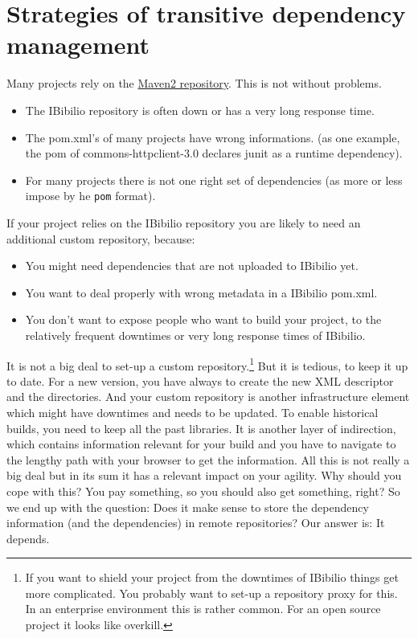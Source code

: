 \section{Strategies of transitive dependency management} %
\label{sec:strategies_of_transitive_dependency_management}
Many projects rely on the \href{http://repo1.maven.org/maven2}{Maven2 repository}. This is not without problems.
\begin{itemize}
	\item The IBibilio repository is often down or has a very long response time.
	\item The pom.xml's of many projects have wrong informations. (as one example, the pom of commons-httpclient-3.0 declares junit as a runtime dependency).
	\item For many projects there is not one right set of dependencies (as more or less impose by he \texttt{pom} format).
\end{itemize}
If your project relies on the IBibilio repository you are likely to need an additional custom repository, because:
\begin{itemize}
	\item You might need dependencies that are not uploaded to IBibilio yet.
	\item You want to deal properly with wrong metadata in a IBibilio pom.xml.
	\item You don't want to expose people who want to build your project, to the relatively frequent downtimes or very long response times of IBibilio.
\end{itemize}
It is not a big deal to set-up a custom repository.\footnote{If you want to shield your project from the downtimes of IBibilio things get more complicated. You probably want to set-up a repository proxy for this. In an enterprise environment this is rather common. For an open source project it looks like overkill.} But it is tedious, to keep it up to date. For a new version, you have always to create the new XML descriptor and the directories. And your custom repository is another infrastructure element which might have downtimes and needs to be updated. To enable historical builds, you need to keep all the past libraries. It is another layer of indirection, which contains information relevant for your build and you have to navigate to the lengthy path with your browser to get the information. All this is not really a big deal but in its sum it has a relevant impact on your agility. Why should you cope with this? You pay something, so you should also get something, right? So we end up with the question: Does it make sense to store the dependency information (and the dependencies) in remote repositories? Our answer is: It depends.

